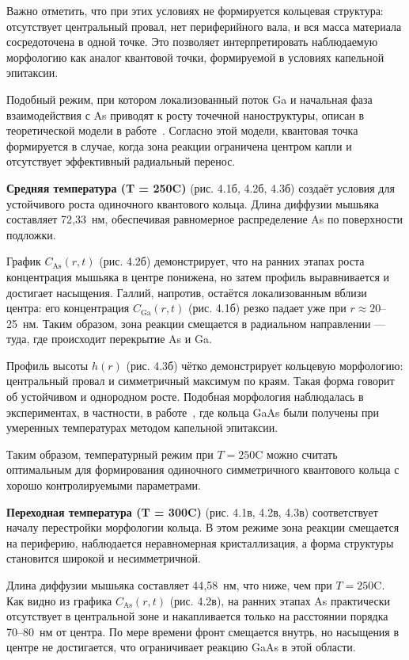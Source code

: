 \documentclass[14pt,oneside]{extarticle}
\begin{document}
Важно отметить, что при этих условиях не формируется кольцевая структура: отсутствует центральный провал, нет периферийного вала, и вся масса материала сосредоточена в одной точке. Это позволяет интерпретировать наблюдаемую морфологию как аналог квантовой точки, формируемой в условиях капельной эпитаксии.

Подобный режим, при котором локализованный поток Ga и начальная фаза взаимодействия с As приводят к росту точечной наноструктуры, описан в теоретической модели в работе~\cite{zhou2013}. Согласно этой модели, квантовая точка формируется в случае, когда зона реакции ограничена центром капли и отсутствует эффективный радиальный перенос.

\textbf{Средняя температура (T = 250\textdegree C)} (рис. 4.1б, 4.2б, 4.3б) создаёт условия для устойчивого роста одиночного квантового кольца. Длина диффузии мышьяка составляет 72{,}33~нм, обеспечивая равномерное распределение As по поверхности подложки.

График $C_\mathrm{As}(r, t)$ (рис. 4.2б) демонстрирует, что на ранних этапах роста концентрация мышьяка в центре понижена, но затем профиль выравнивается и достигает насыщения. Галлий, напротив, остаётся локализованным вблизи центра: его концентрация $C_\mathrm{Ga}(r, t)$ (рис. 4.1б) резко падает уже при $r \approx 20$--25~нм. Таким образом, зона реакции смещается в радиальном направлении — туда, где происходит перекрытие As и Ga.

Профиль высоты $h(r)$ (рис. 4.3б) чётко демонстрирует кольцевую морфологию: центральный провал и симметричный максимум по краям. Такая форма говорит об устойчивом и однородном росте. Подобная морфология наблюдалась в экспериментах, в частности, в работе~\cite{mano2005nano}, где кольца GaAs были получены при умеренных температурах методом капельной эпитаксии.

Таким образом, температурный режим при $T = 250$\textdegree C можно считать оптимальным для формирования одиночного симметричного квантового кольца с хорошо контролируемыми параметрами.

\textbf{Переходная температура (T = 300\textdegree C)} (рис. 4.1в, 4.2в, 4.3в) соответствует началу перестройки морфологии кольца. В этом режиме зона реакции смещается на периферию, наблюдается неравномерная кристаллизация, а форма структуры становится широкой и несимметричной.

Длина диффузии мышьяка составляет 44{,}58~нм, что ниже, чем при $T = 250$\textdegree C. Как видно из графика $C_\mathrm{As}(r, t)$ (рис. 4.2в), на ранних этапах As практически отсутствует в центральной зоне и накапливается только на расстоянии порядка 70--80~нм от центра. По мере времени фронт смещается внутрь, но насыщения в центре не достигается, что ограничивает реакцию GaAs в этой области.
\end{document}
